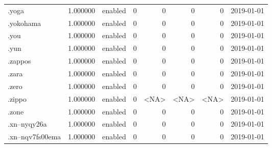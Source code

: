 \begin{tabular}{lrlrrrrl}
.yoga                     &          1.000000 &         enabled &                           0 &                           0 &                           0 &                   0 &           2019-01-01 \\
.yokohama                 &          1.000000 &         enabled &                           0 &                           0 &                           0 &                   0 &           2019-01-01 \\
.you                      &          1.000000 &         enabled &                           0 &                           0 &                           0 &                   0 &           2019-01-01 \\
.yun                      &          1.000000 &         enabled &                           0 &                           0 &                           0 &                   0 &           2019-01-01 \\
.zappos                   &          1.000000 &         enabled &                           0 &                           0 &                           0 &                   0 &           2019-01-01 \\
.zara                     &          1.000000 &         enabled &                           0 &                           0 &                           0 &                   0 &           2019-01-01 \\
.zero                     &          1.000000 &         enabled &                           0 &                           0 &                           0 &                   0 &           2019-01-01 \\
.zippo                    &          1.000000 &         enabled &                           0 &                        <NA> &                        <NA> &                <NA> &           2019-01-01 \\
.zone                     &          1.000000 &         enabled &                           0 &                           0 &                           0 &                   0 &           2019-01-01 \\
.xn--nyqy26a              &          1.000000 &         enabled &                           0 &                           0 &                           0 &                   0 &           2019-01-01 \\
.xn--nqv7fs00ema          &          1.000000 &         enabled &                           0 &                           0 &                           0 &                   0 &           2019-01-01 \\

\end{tabular}
